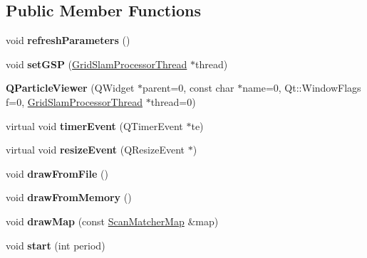 \subsection*{Public Member Functions}
\begin{DoxyCompactItemize}
\item 
\mbox{\label{classGMapping_1_1QParticleViewer_ab1c90a321c5bacf58da35dd9555cf238}} 
void {\bfseries refresh\+Parameters} ()
\item 
\mbox{\label{classGMapping_1_1QParticleViewer_a0040f129b4d2e27cbb74007b5b330032}} 
void {\bfseries set\+G\+SP} (\hyperlink{structGridSlamProcessorThread}{Grid\+Slam\+Processor\+Thread} $\ast$thread)
\item 
\mbox{\label{classGMapping_1_1QParticleViewer_ab33f2169961d04182ef5a6443af392ce}} 
{\bfseries Q\+Particle\+Viewer} (Q\+Widget $\ast$parent=0, const char $\ast$name=0, Qt\+::\+Window\+Flags f=0, \hyperlink{structGridSlamProcessorThread}{Grid\+Slam\+Processor\+Thread} $\ast$thread=0)
\item 
\mbox{\label{classGMapping_1_1QParticleViewer_a73de994d7c18a9685b605d836980782d}} 
virtual void {\bfseries timer\+Event} (Q\+Timer\+Event $\ast$te)
\item 
\mbox{\label{classGMapping_1_1QParticleViewer_a34d50616bf939a45856d07c0c3e8430a}} 
virtual void {\bfseries resize\+Event} (Q\+Resize\+Event $\ast$)
\item 
\mbox{\label{classGMapping_1_1QParticleViewer_ab1c8e75f06524812bebc264f26bf2df0}} 
void {\bfseries draw\+From\+File} ()
\item 
\mbox{\label{classGMapping_1_1QParticleViewer_a2c08a8eb63d44e7319a48e1110ef4a93}} 
void {\bfseries draw\+From\+Memory} ()
\item 
\mbox{\label{classGMapping_1_1QParticleViewer_a3e48703f01b28717da91a75fd078fd59}} 
void {\bfseries draw\+Map} (const \hyperlink{classGMapping_1_1Map}{Scan\+Matcher\+Map} \&map)
\item 
\mbox{\label{classGMapping_1_1QParticleViewer_ab0fda4c3f050d5616cd910b74f81c3b1}} 
void {\bfseries start} (int period)
\end{DoxyCompactItemize}
